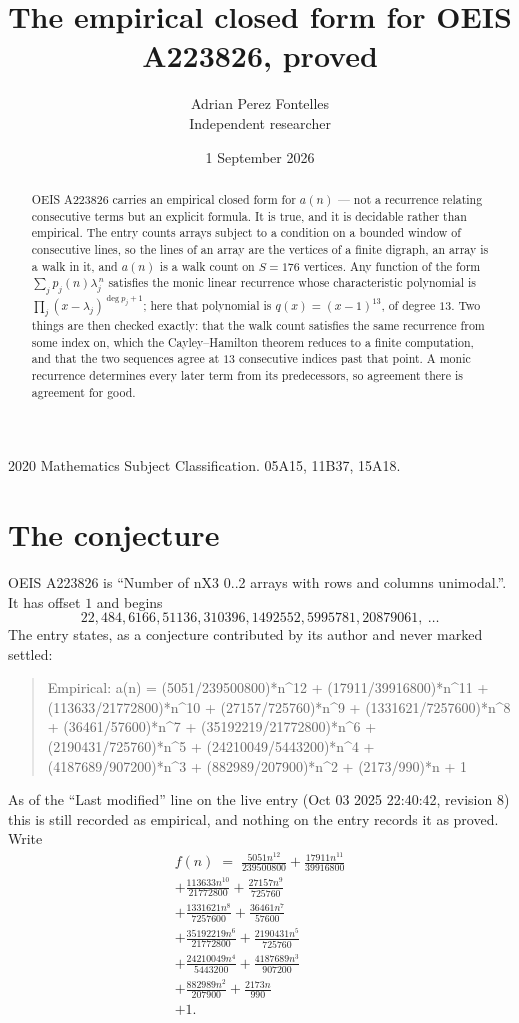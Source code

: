\documentclass[11pt,a4paper]{article}
\title{The empirical closed form for OEIS A223826, proved}
\author{Adrian Perez Fontelles\\ \small Independent researcher}
\date{1 September 2026}
\theoremstyle{plain}
\theoremstyle{definition}
\begin{document}
\maketitle

\begin{abstract}
OEIS A223826 carries an empirical closed form for $a(n)$ --- not a recurrence relating
consecutive terms but an explicit formula. It is true, and it is decidable rather than
empirical. The entry counts arrays subject to a condition on a bounded window of consecutive lines, so the lines of an array are the
vertices of a finite digraph, an array is a walk in it, and $a(n)$ is a walk count on
$S=176$ vertices. Any function of the form $\sum_j p_j(n)\lambda_j^{\,n}$ satisfies the
monic linear recurrence whose characteristic polynomial is
$\prod_j(x-\lambda_j)^{\deg p_j+1}$; here that polynomial is $q(x)=(x-1)^{13}$, of degree
$13$. Two things are then checked exactly: that the walk count satisfies the same
recurrence from some index on, which the Cayley--Hamilton theorem reduces to a finite
computation, and that the two sequences agree at $13$ consecutive indices past that
point. A monic recurrence determines every later term from its predecessors, so agreement
there is agreement for good.
\end{abstract}

\noindent\small 2020 Mathematics Subject Classification. 05A15, 11B37, 15A18.\normalsize

\section{The conjecture}

OEIS A223826 is ``Number of nX3 0..2 arrays with rows and columns unimodal.''. It has offset $1$ and begins
\[
22, 484, 6166, 51136, 310396, 1492552, 5995781, 20879061,\ \dots
\]
The entry states, as a conjecture contributed by its author and never marked settled:
\begin{quote}
Empirical: a(n) = (5051/239500800)*n\^{}12 + (17911/39916800)*n\^{}11 + (113633/21772800)*n\^{}10 + (27157/725760)*n\^{}9 + (1331621/7257600)*n\^{}8 + (36461/57600)*n\^{}7 + (35192219/21772800)*n\^{}6 + (2190431/725760)*n\^{}5 + (24210049/5443200)*n\^{}4 + (4187689/907200)*n\^{}3 + (882989/207900)*n\^{}2 + (2173/990)*n + 1
\end{quote}
As of the ``Last modified'' line on the live entry (Oct 03 2025 22:40:42, revision 8) this is still
recorded as empirical, and nothing on the entry records it as proved. Write
\begin{multline*}
f(n)\;=\;\frac{5051 n^{12}}{239500800} + \frac{17911 n^{11}}{39916800} \\
+ \frac{113633 n^{10}}{21772800} + \frac{27157 n^{9}}{725760} \\
+ \frac{1331621 n^{8}}{7257600} + \frac{36461 n^{7}}{57600} \\
+ \frac{35192219 n^{6}}{21772800} + \frac{2190431 n^{5}}{725760} \\
+ \frac{24210049 n^{4}}{5443200} + \frac{4187689 n^{3}}{907200} \\
+ \frac{882989 n^{2}}{207900} + \frac{2173 n}{990} \\
+ 1.
\end{multline*}
\end{document}
